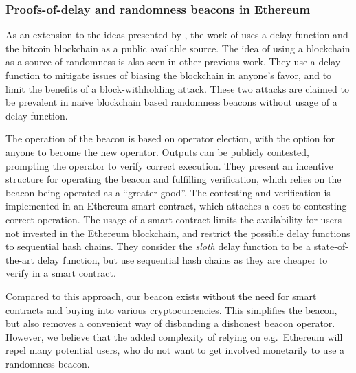 \subsubsection{Proofs-of-delay and randomness beacons in Ethereum}%
\label{ssub:proofs_of_delay}
As an extension to the ideas presented by \citet{randomzoo}, the work of \citet{bunz2017proofsof} uses a delay function and the bitcoin blockchain as a public available source.
The idea of using a blockchain as a source of randomness is also seen in other previous work.
They use a delay function to mitigate issues of biasing the blockchain in anyone's favor, and to limit the benefits of a block-withholding attack.
These two attacks are claimed to be prevalent in naïve blockchain based randomness beacons without usage of a delay function.

The operation of the beacon is based on operator election, with the option for anyone to become the new operator.
Outputs can be publicly contested, prompting the operator to verify correct execution.
They present an incentive structure for operating the beacon and fulfilling verification, which relies on the beacon being operated as a \enquote{greater good}.
The contesting and verification is implemented in an Ethereum smart contract, which attaches a cost to contesting correct operation.
The usage of a smart contract limits the availability for users not invested in the Ethereum blockchain, and restrict the possible delay functions to sequential hash chains.
They consider the \textit{sloth} delay function to be a state-of-the-art delay function, but use sequential hash chains as they are cheaper to verify in a smart contract.

Compared to this approach, our beacon exists without the need for smart contracts and buying into various cryptocurrencies.
This simplifies the beacon, but also removes a convenient way of disbanding a dishonest beacon operator.
However, we believe that the added complexity of relying on e.g.\ Ethereum will repel many potential users, who do not want to get involved monetarily to use a randomness beacon.

